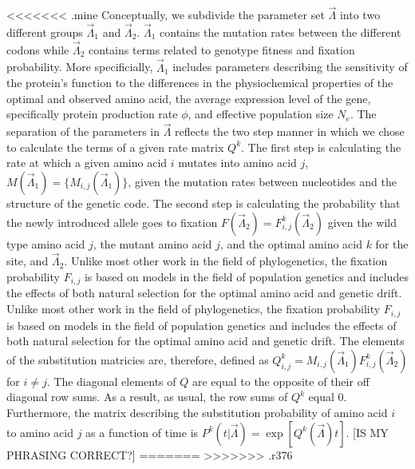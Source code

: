 \documentclass[13pt]{article}
\begin{document}
<<<<<<< .mine
Conceptually, we subdivide the parameter set $\vec{\Lambda}$ into two different groups $\vec{\Lambda}_1$ and $\vec{\Lambda}_2$.
$\vec{\Lambda}_1$ contains the mutation rates between the different codons while $\vec{\Lambda}_2$ contains terms related to genotype fitness and fixation probability.
More specificially, $\vec{\Lambda}_1$ includes parameters describing the sensitivity of the protein's function to the differences in the physiochemical properties of the optimal and observed amino acid, the average expression level of the gene, specifically protein production rate $\phi$, and effective population size $N_e$.
The separation of the parameters in $\vec{\Lambda}$ reflects the two step manner in which we chose to calculate the terms of a given rate matrix $Q^k$.
The first step is calculating the rate at which a given amino acid $i$ mutates into amino acid $j$, $M(\vec{\Lambda}_1) = \{M_{i,j}(\vec{\Lambda}_1)\}$, given the mutation rates between nucleotides and the structure of the genetic code.
The second step is calculating the probability that the newly introduced allele goes to fixation   $F(\vec{\Lambda}_2) = F^k_{i,j}(\vec{\Lambda}_2)$ given the wild type amino acid $j$, the mutant amino acid $j$, and the optimal amino acid $k$ for the site, and $\vec{\Lambda}_2$.
Unlike most other work in the field of phylogenetics, the fixation probability $F_{i,j}$ is based on models in the field of population genetics and includes the effects of both natural selection for the optimal amino acid and genetic drift.
Unlike most other work in the field of phylogenetics, the fixation probability $F_{i,j}$ is based on models in the field of population genetics and includes the effects of both natural selection for the optimal amino acid and genetic drift.
The elements of the substitution matricies are, therefore, defined as  $Q^k_{i,j} = M_{i,j}(\vec{\Lambda}_1) F^k_{i,j}(\vec{\Lambda}_2)$ for $i \neq j$.
The diagonal elements of $Q$ are equal to the opposite of their off diagonal row sums.
As a result, as usual, the row sums of $Q^k$ equal 0.
Furthermore, the matrix describing the substitution probability of amino acid $i$ to amino acid $j$ as a function of time is $P^k(t|\vec{\Lambda}) = \exp\left[Q^k(\vec{\Lambda}) t\right]$. [IS MY PHRASING CORRECT?] %
=======
>>>>>>> .r376
\end{document}

